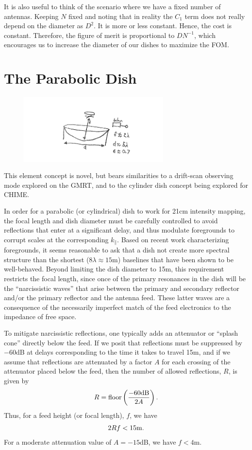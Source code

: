 \documentclass[11pt]{article}
\begin{document}
It is also useful to think of the scenario where we have a fixed number of
antennas. Keeping $N$ fixed and noting that in reality the $C_{1}$ term does not
really depend on the diameter as $D^{2}$. It is more or less constant. Hence,
the cost is constant. Therefore, the figure of merit is proportional to
$DN^{-1}$, which encourages us to increase the diameter of our dishes to
maximize the FOM.

\section{The Parabolic Dish}

\begin{figure}[!b]
\centering
\includegraphics[width=3in]{dish_plots/eor_dish.png}
\caption{}
\label{fig:element_dish}
\end{figure}

This element concept is novel, but bears similarities to a drift-scan observing
mode explored on the GMRT, and to the cylinder dish concept being explored for
CHIME.  

In order for a parabolic (or cylindrical) dish to work for 21cm intensity
mapping, the focal length and dish diameter must be carefully controlled to
avoid reflections that enter at a significant delay, and thus modulate
foregrounds to corrupt scales at the corresponding $k_\parallel$.  Based on
recent work characterizing foregrounds, it seems reasonable to ask that a dish
not create more spectral structure than the shortest ($8\lambda\approx15$m)
baselines that have been shown to be well-behaved.  Beyond limiting the dish
diameter to 15m, this requirement restricts the focal length, since once of the
primary resonances in the dish will be the ``narcissistic waves'' that arise
between the primary and secondary reflector and/or the primary reflector and the
antenna feed.  These latter waves are a consequence of the necessarily imperfect
match of the feed electronics to the impedance of free space.

To mitigate narcissistic reflections, one typically adds an attenuator or
``splash cone'' directly below the feed.  If we posit that reflections must be
suppressed by $-60$dB at delays corresponding to the time it takes to travel
15m, and if we assume that reflections are attenuated by a factor $A$ for each
crossing of the attenuator placed below the feed, then the number of allowed
reflections, $R$, is given by
\begin{equation}
R={\rm floor}\left(\frac{-60{\rm dB}}{2A}\right).
\end{equation}
Thus, for a feed height (or focal length), $f$, we have
\begin{equation}
2Rf<15{\rm m}.
\end{equation}
For a moderate attenuation value of $A=-15$dB, we have $f<4$m.
\end{document}
